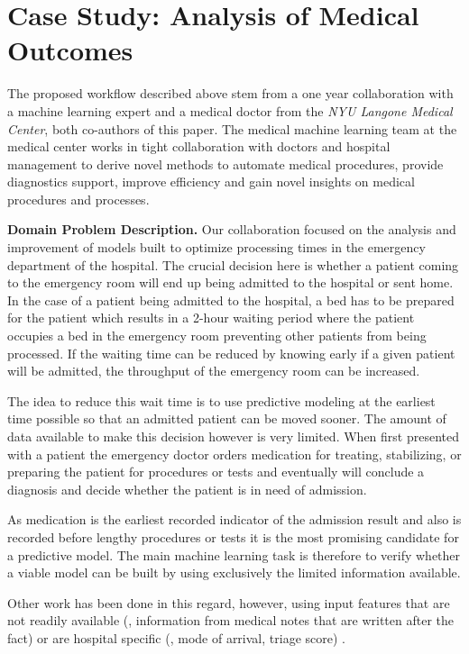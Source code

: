 \section{Case Study: Analysis of Medical Outcomes} %
\label{sec:case_study}

The proposed workflow described above stem from a one year collaboration with a machine learning expert and a medical doctor from the \textit{NYU Langone Medical Center}, both co-authors of this paper. The medical machine learning team at the medical center works in tight collaboration with doctors and hospital management to derive novel methods to automate medical procedures, provide diagnostics support, improve efficiency and gain novel insights on medical procedures and processes.

\noindent \textbf{Domain Problem Description.}
Our collaboration focused on the analysis and improvement of models built to optimize processing times in the emergency department of the hospital. The crucial decision here is whether a patient coming to the emergency room will end up being admitted to the hospital or sent home. In the case of a patient being admitted to the hospital, a bed has to be prepared for the patient which results in a 2-hour waiting period where the patient occupies a bed in the emergency room preventing other patients from being processed. If the waiting time can be reduced by knowing early if a given patient will be admitted, the throughput of the emergency room can be increased.



The idea to reduce this wait time is to use predictive modeling at the earliest time possible so that an admitted patient can be moved sooner. The amount of data available to make this decision however is very limited. When first presented with a patient the emergency doctor orders medication for treating, stabilizing, or preparing the patient for procedures or tests and eventually will conclude a diagnosis and decide whether the patient is in need of admission.

As medication is the earliest recorded indicator of the admission result and also is recorded before lengthy procedures or tests it is the most promising candidate for a predictive model. The main machine learning task is therefore to verify whether a viable model can be built by using exclusively the limited information available.

Other work has been done in this regard, however, using input features that are not readily available (\eg, information from medical notes that are written after the fact) or are hospital specific (\eg, mode of arrival, triage score) \cite{pmid21705374,pmid24421344,pmid24509606}.

